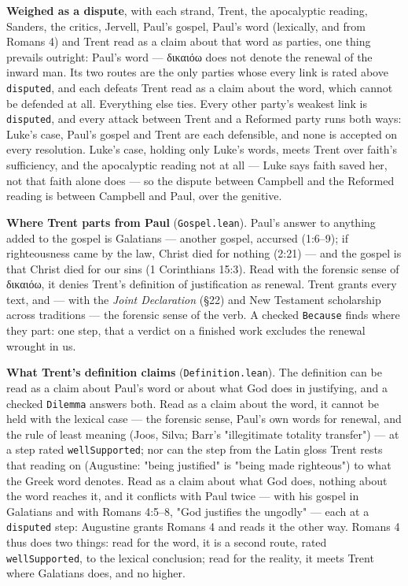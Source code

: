 \documentclass[11pt]{article}
\begin{document}
\textbf{Weighed as a dispute}, with each strand, Trent, the apocalyptic reading, Sanders, the critics, Jervell, Paul's gospel, Paul's word (lexically, and from Romans 4) and Trent read as a claim about that word as parties, one thing prevails outright: Paul's word — δικαιόω does not denote the renewal of the inward man. Its two routes are the only parties whose every link is rated above \texttt{disputed}, and each defeats Trent read as a claim about the word, which cannot be defended at all. Everything else ties. Every other party's weakest link is \texttt{disputed}, and every attack between Trent and a Reformed party runs both ways: Luke's case, Paul's gospel and Trent are each defensible, and none is accepted on every resolution. Luke's case, holding only Luke's words, meets Trent over faith's sufficiency, and the apocalyptic reading not at all — Luke says faith saved her, not that faith alone does — so the dispute between Campbell and the Reformed reading is between Campbell and Paul, over the genitive.

\textbf{Where Trent parts from Paul} (\texttt{Gospel.lean}). Paul's answer to anything added to the gospel is Galatians — another gospel, accursed (1:6–9); if righteousness came by the law, Christ died for nothing (2:21) — and the gospel is that Christ died for our sins (1 Corinthians 15:3). Read with the forensic sense of δικαιόω, it denies Trent's definition of justification as renewal. Trent grants every text, and — with the \emph{Joint Declaration} (§22) and New Testament scholarship across traditions — the forensic sense of the verb. A checked \texttt{Because} finds where they part: one step, that a verdict on a finished work excludes the renewal wrought in us.

\textbf{What Trent's definition claims} (\texttt{Definition.lean}). The definition can be read as a claim about Paul's word or about what God does in justifying, and a checked \texttt{Dilemma} answers both. Read as a claim about the word, it cannot be held with the lexical case — the forensic sense, Paul's own words for renewal, and the rule of least meaning (Joos, Silva; Barr's "illegitimate totality transfer") — at a step rated \texttt{well\allowbreak{}Supported}; nor can the step from the Latin gloss Trent rests that reading on (Augustine: "being justified" is "being made righteous") to what the Greek word denotes. Read as a claim about what God does, nothing about the word reaches it, and it conflicts with Paul twice — with his gospel in Galatians and with Romans 4:5–8, "God justifies the ungodly" — each at a \texttt{disputed} step: Augustine grants Romans 4 and reads it the other way. Romans 4 thus does two things: read for the word, it is a second route, rated \texttt{well\allowbreak{}Supported}, to the lexical conclusion; read for the reality, it meets Trent where Galatians does, and no higher.
\end{document}
